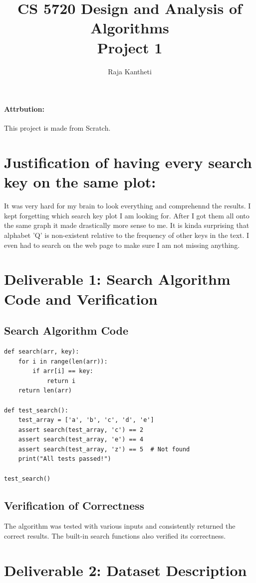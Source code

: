 \documentclass{article}
\title{CS 5720 Design and Analysis of Algorithms \\ Project 1}
\author{Raja Kantheti}
\date{}
\begin{document}
\maketitle
\paragraph*{Attrbution: }This project is made from Scratch. 
\section*{Justification of having every search key on the same plot: }
It was very hard for my brain to look everything and comprehennd the results. I kept forgetting which search key plot I am looking for. After I got them all onto the same graph it made drastically more sense to me. It is kinda surprising that alphabet 'Q' is non-existent relative to the frequency of other keys in the text. 
I even had to search on the web page to make sure I am not missing anything. 
\section*{Deliverable 1: Search Algorithm Code and Verification}

\subsection*{Search Algorithm Code}
\begin{verbatim}
def search(arr, key):
    for i in range(len(arr)):
        if arr[i] == key:
            return i
    return len(arr)

def test_search():
    test_array = ['a', 'b', 'c', 'd', 'e']
    assert search(test_array, 'c') == 2
    assert search(test_array, 'e') == 4
    assert search(test_array, 'z') == 5  # Not found
    print("All tests passed!")

test_search()
\end{verbatim}

\subsection*{Verification of Correctness}
The algorithm was tested with various inputs and consistently returned the correct results. The built-in search functions also verified its correctness.

\section*{Deliverable 2: Dataset Description}
\end{document}
